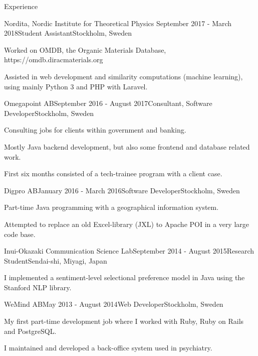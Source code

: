 \documentclass{resume} %
\begin{document}
\begin{rSection}{Experience}

\begin{rSubsection}{Nordita, Nordic Institute for Theoretical Physics} {September 2017 - March 2018}{Student Assistant}{Stockholm, Sweden}
\item Worked on OMDB, the Organic Materials Database, https://omdb.diracmaterials.org
\item Assisted in web development and similarity computations (machine learning),\\using mainly Python 3 and PHP with Laravel.
\end{rSubsection}

\begin{rSubsection}{Omegapoint AB}{September 2016 - August 2017}{Consultant, Software Developer}{Stockholm, Sweden}
\item Consulting jobs for clients within government and banking. 
\item Mostly Java backend development, but also some frontend and database related work.
\item First six months consisted of a tech-trainee program with a client case.
\end{rSubsection}


\begin{rSubsection}{Digpro AB}{January 2016 - March 2016}{Software Developer}{Stockholm, Sweden}
\item Part-time Java programming with a geographical information system.
\item Attempted to replace an old Excel-library (JXL) to Apache POI in a very large code base.
\end{rSubsection}


\begin{rSubsection}{Inui-Okazaki Communication Science Lab}{September 2014 - August 2015}{Research Student}{Sendai-shi, Miyagi, Japan}
\item I implemented a sentiment-level selectional preference model in Java using the Stanford NLP library.
\end{rSubsection}


\begin{rSubsection}{WeMind AB}{May 2013 - August 2014}{Web Developer}{Stockholm, Sweden}
\item My first part-time development job where I worked with Ruby, Ruby on Rails and PostgreSQL.
\item I maintained and developed a back-office system used in psychiatry.
\end{rSubsection}

\end{rSection}
\end{document}
